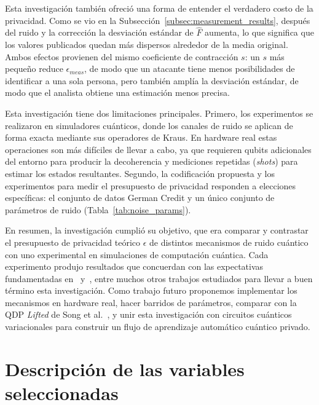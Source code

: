 \documentclass{ieeeaccess}
\begin{document}
Esta investigación también ofreció una forma de entender el verdadero costo de la privacidad. Como se vio en la Subsección~\ref{subsec:measurement_results}, después del ruido y la corrección la desviación estándar de $\hat{F}$ aumenta, lo que significa que los valores publicados quedan más dispersos alrededor de la media original. Ambos efectos provienen del mismo coeficiente de contracción $s$: un $s$ más pequeño reduce $\epsilon_{meas}$, de modo que un atacante tiene menos posibilidades de identificar a una sola persona, pero también amplía la desviación estándar, de modo que el analista obtiene una estimación menos precisa.

Esta investigación tiene dos limitaciones principales. Primero, los experimentos se realizaron en simuladores cuánticos, donde los canales de ruido se aplican de forma exacta mediante sus operadores de Kraus. En hardware real estas operaciones son más difíciles de llevar a cabo, ya que requieren qubits adicionales del entorno para producir la decoherencia y mediciones repetidas (\textit{shots}) para estimar los estados resultantes. Segundo, la codificación propuesta y los experimentos para medir el presupuesto de privacidad responden a elecciones específicas: el conjunto de datos German Credit y un único conjunto de parámetros de ruido (Tabla~\ref{tab:noise_params}).

En resumen, la investigación cumplió su objetivo, que era comparar y contrastar el presupuesto de privacidad teórico $\epsilon$ de distintos mecanismos de ruido cuántico con uno experimental en simulaciones de computación cuántica. Cada experimento produjo resultados que concuerdan con las expectativas fundamentadas en~\cite{zhou2017differential} y~\cite{dwork2014algorithmic}, entre muchos otros trabajos estudiados para llevar a buen término esta investigación. Como trabajo futuro proponemos implementar los mecanismos en hardware real, hacer barridos de parámetros, comparar con la QDP \textit{Lifted} de Song et al.~\cite{song2025hybrid}, y unir esta investigación con circuitos cuánticos variacionales para construir un flujo de aprendizaje automático cuántico privado.

\clearpage
\appendices

\renewcommand{\thelemma}{\Alph{section}.\arabic{lemma}}
\renewcommand{\theproposition}{\Alph{section}.\arabic{proposition}}

\section{Descripción de las variables seleccionadas}
\label{ap:selected_features}
\end{document}
